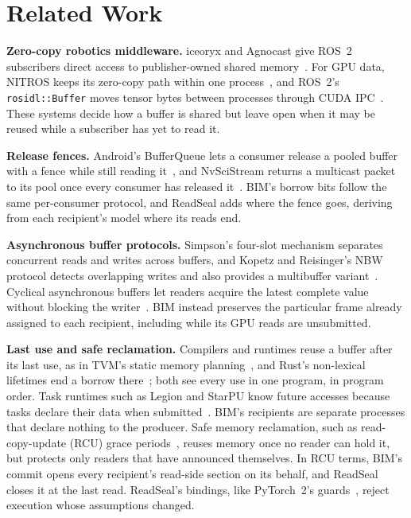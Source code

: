 \documentclass[conference]{IEEEtran}
\newcommand{\code}[1]{\texttt{#1}}
\begin{document}
\section{Related Work}
\label{sec:related}

\textbf{Zero-copy robotics middleware.} iceoryx and Agnocast give ROS~2 subscribers direct access to publisher-owned shared memory~\cite{iceoryx,agnocast}. For GPU data, NITROS keeps its zero-copy path within one process~\cite{nitros}, and ROS~2's \code{rosidl::Buffer} moves tensor bytes between processes through CUDA IPC~\cite{rosidlbuffer}. These systems decide how a buffer is shared but leave open when it may be reused while a subscriber has yet to read it.

\textbf{Release fences.} Android's BufferQueue lets a consumer release a pooled buffer with a fence while still reading it~\cite{bufferqueue}, and NvSciStream returns a multicast packet to its pool once every consumer has released it~\cite{nvscistream}. BIM's borrow bits follow the same per-consumer protocol, and ReadSeal adds where the fence goes, deriving from each recipient's model where its reads end.

\textbf{Asynchronous buffer protocols.} Simpson's four-slot mechanism separates concurrent reads and writes across buffers, and Kopetz and Reisinger's NBW protocol detects overlapping writes and also provides a multibuffer variant~\cite{simpson,nbw}. Cyclical asynchronous buffers let readers acquire the latest complete value without blocking the writer~\cite{buttazzocab}. BIM instead preserves the particular frame already assigned to each recipient, including while its GPU reads are unsubmitted.

\textbf{Last use and safe reclamation.} Compilers and runtimes reuse a buffer after its last use, as in TVM's static memory planning~\cite{tvm}, and Rust's non-lexical lifetimes end a borrow there~\cite{nll}; both see every use in one program, in program order.
Task runtimes such as Legion and StarPU know future accesses because tasks declare their data when submitted~\cite{legion,starpu}.
BIM's recipients are separate processes that declare nothing to the producer. Safe memory reclamation, such as read-copy-update (RCU) grace periods~\cite{rcu}, reuses memory once no reader can hold it, but protects only readers that have announced themselves. In RCU terms, BIM's commit opens every recipient's read-side section on its behalf, and ReadSeal closes it at the last read. ReadSeal's bindings, like PyTorch~2's guards~\cite{pytorch2}, reject execution whose assumptions changed.
\end{document}
